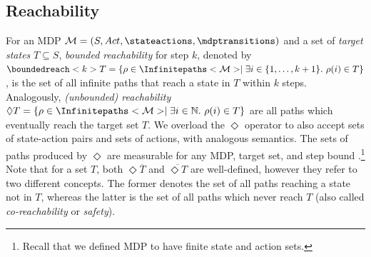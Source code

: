\documentclass{theoretics}
\newcommand{\setcomplement}[1]{\overline{#1}}
\newcommand{\Naturals}{\mathbb{N}}
\newcommand{\MDP}{\mathcal{M}}
\newcommand{\States}{S}
\newcommand{\Actions}{Act}
\newcommand{\infinitepath}{\rho}
\newcommand{\reach}{\Diamond}
\newcommand{\targetset}{T}
\begin{document}
\subsection{Reachability}
For an MDP $\MDP = (\States, \Actions, \stateactions, \mdptransitions)$ and a set of \emph{target states} $T \subseteq \States$, \emph{bounded reachability} for step $k$, denoted by $\boundedreach<k> T = \{\infinitepath \in \Infinitepaths<\MDP> \mid \exists i \in \{1, \dots, k + 1\}.~\infinitepath(i) \in T\}$, is the set of all infinite paths that reach a state in $T$ within $k$ steps.
Analogously, \emph{(unbounded) reachability} $\reach T = \{\infinitepath \in \Infinitepaths<\MDP> \mid \exists i \in \Naturals.~\infinitepath(i) \in T\}$ are all paths which eventually reach the target set $T$.
We overload the $\reach$ operator to also accept sets of state-action pairs and sets of actions, with analogous semantics.
The sets of paths produced by $\reach$ are measurable for any MDP, target set, and step bound \cite[Section~10.1.1]{DBLP:books/daglib/0020348}.\footnote{Recall that we defined MDP to have finite state and action sets.}
Note that for a set $\targetset$, both $\reach \setcomplement{\targetset}$ and $\setcomplement{\reach \targetset}$ are well-defined, however they refer to two different concepts.
The former denotes the set of all paths reaching a state not in $\targetset$, whereas the latter is the set of all paths which never reach $\targetset$ (also called \emph{co-reachability} or \emph{safety}).
\end{document}
